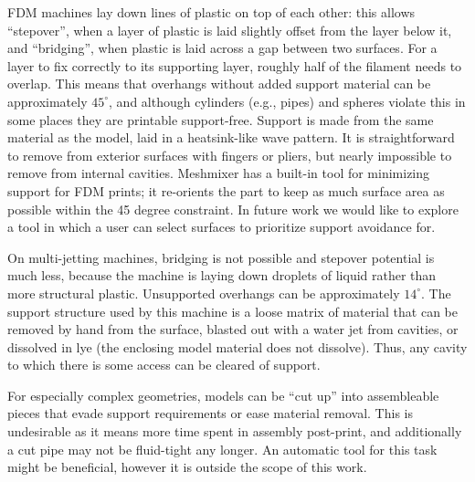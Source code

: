 FDM machines lay down lines of plastic on top of each other: this allows ``stepover'', when a layer of plastic is laid slightly offset from the layer below it, and ``bridging'', when plastic is laid across a gap between two surfaces.  For a layer to fix correctly to its supporting layer, roughly half of the filament needs to overlap.  This means that overhangs without added support material can be approximately $45^{\circ}$, and although cylinders (e.g., pipes) and spheres violate this in some places they are printable support-free.  Support is made from the same material as the model, laid in a heatsink-like wave pattern.  It is straightforward to remove from exterior surfaces with fingers or pliers, but nearly impossible to remove from internal cavities.  Meshmixer has a built-in tool for minimizing support for FDM prints; it re-orients the part to keep as much surface area as possible within the 45 degree constraint.  In future work we would like to explore a tool in which a user can select surfaces to prioritize support avoidance for.  

On multi-jetting machines, bridging is not possible and stepover potential is much less, because the machine is laying down droplets of liquid rather than more structural plastic.  Unsupported overhangs can be approximately $14^{\circ}$.  The support structure used by this machine is a loose matrix of material that can be removed by hand from the surface, blasted out with a water jet from cavities, or dissolved in lye (the enclosing model material does not dissolve).  Thus, any cavity to which there is some access can be cleared of support.

For especially complex geometries, models can be ``cut up'' into assembleable pieces that evade support requirements or ease material removal.  This is undesirable as it means more time spent in assembly post-print, and additionally a cut pipe may not be fluid-tight any longer.  An automatic tool for this task might be beneficial, however it is outside the scope of this work.
